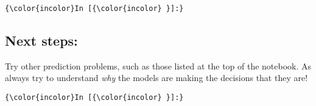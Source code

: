 \documentclass[11pt]{article}
\begin{document}
    \begin{Verbatim}[commandchars=\\\{\}]
{\color{incolor}In [{\color{incolor} }]:} 
\end{Verbatim}


    \subsection{Next steps:}\label{next-steps}

Try other prediction problems, such as those listed at the top of the
notebook. As always try to understand \emph{why} the models are making
the decisions that they are!

    \begin{Verbatim}[commandchars=\\\{\}]
{\color{incolor}In [{\color{incolor} }]:} 
\end{Verbatim}



    
    
    
    
\end{document}
